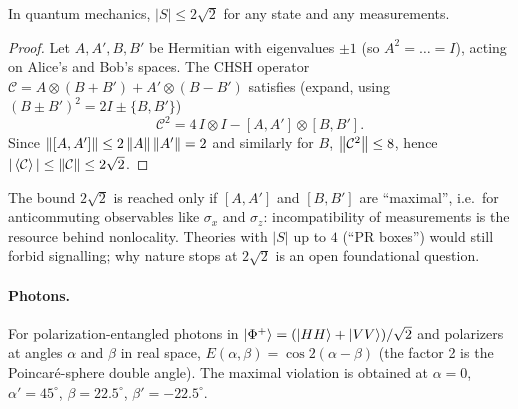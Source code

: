 \begin{theorem}
In quantum mechanics, $|S|\le2\sqrt2$ for any state and any measurements.
\end{theorem}
\begin{proof}
Let $A,A',B,B'$ be Hermitian with eigenvalues $\pm1$ (so $A^2=\dots=I$), acting on Alice's and Bob's spaces. The CHSH operator
$\mathcal C=A\otimes(B+B')+A'\otimes(B-B')$ satisfies (expand, using $(B\pm B')^2=2I\pm\{B,B'\}$)
\begin{equation}
  \mathcal C^2=4\,I\otimes I-[A,A']\otimes[B,B'].
\end{equation}
Since $\left\|[A,A']\right\|\le2\left\|A\right\|\left\|A'\right\|=2$ and similarly for $B$, $\left\|\mathcal C^2\right\|\le8$, hence $|\left\langle\mathcal C\right\rangle|\le\left\|\mathcal C\right\|\le2\sqrt2$.
\end{proof}
The bound $2\sqrt2$ is reached only if $[A,A']$ and $[B,B']$ are ``maximal'', i.e.\ for anticommuting observables like $\sigma_x$ and $\sigma_z$: incompatibility of
measurements is the resource behind nonlocality. Theories with $|S|$ up to $4$ (``PR boxes'') would still forbid signalling; why nature stops at $2\sqrt2$ is an open
foundational question.

\paragraph{Photons.} For polarization-entangled photons in $\left|\Phi^+\right\rangle=(\left|HH\right\rangle+\left|VV\right\rangle)/\sqrt2$ and polarizers at angles $\alpha$ and $\beta$ in real space,
$E(\alpha,\beta)=\cos2(\alpha-\beta)$ (the factor 2 is the Poincaré-sphere double angle). The maximal violation is obtained at $\alpha=0$, $\alpha'=45^\circ$,
$\beta=22.5^\circ$, $\beta'=-22.5^\circ$.

